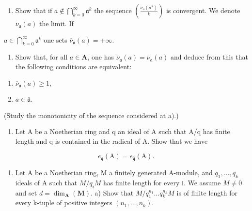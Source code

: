 \begin{enumerate}
\def\labelenumi{\alph{enumi})}
\tightlist
\item
  Show that if \(a \notin \bigcap_{k=0}^{\infty} \mathfrak{a}^k\) the sequence \(\left(\frac{\nu_{\mathfrak{a}}(a^k)}{k}\right)\) is convergent. We denote \(\overline{\nu}_{\mathfrak{a}}(a)\) the limit. If
\end{enumerate}

\(a \in \bigcap_{k=0}^{\infty} \mathfrak{a}^{k}\) one sets \(\overline{\nu}_{\mathfrak{a}}(a) = +\infty\).

\begin{enumerate}
\def\labelenumi{\alph{enumi})}
\setcounter{enumi}{1}
\tightlist
\item
  Show that, for all \(a \in \mathbf{A}\), one has \(\overline{\nu}_{\mathfrak{a}}(a) = \overline{\nu}_{\mathfrak{a}}(a)\) and deduce from this that the following conditions are equivalent:
\end{enumerate}

\begin{enumerate}
\def\labelenumi{(\roman{enumi})}
\item
  \(\overline{\nu}_{\mathfrak{a}}(a)\geqslant 1,\)
\item
  \(a \in \overline{\mathfrak{a}}\).
\end{enumerate}

(Study the monotonicity of the sequence considered at a).)

\begin{enumerate}
\def\labelenumi{\arabic{enumi})}
\setcounter{enumi}{18}
\tightlist
\item
  Let A be a Noetherian ring and q an ideal of A such that A/q has finite length and q is contained in the radical of A. Show that we have
\end{enumerate}

\[
e _ {\mathfrak {q}} (\mathrm{A}) = e _ {\overline {{\mathfrak {q}}}} (\mathrm{A}).
\]

\begin{enumerate}
\def\labelenumi{\arabic{enumi})}
\setcounter{enumi}{19}
\tightlist
\item
  Let A be a Noetherian ring, M a finitely generated A-module, and \(q_{1}, \ldots, q_{k}\) ideals of A such that \(M/q_{i}M\) has finite length for every i. We assume \(M \neq 0\) and set \(d = \dim_{\mathbf{A}}(\mathbf{M})\). a) Show that \(M/q_{1}^{n_{1}} \ldots q_{k}^{n_{k}}M\) is of finite length for every k-tuple of positive integers \((n_{1}, \ldots, n_{k})\).
\end{enumerate}

